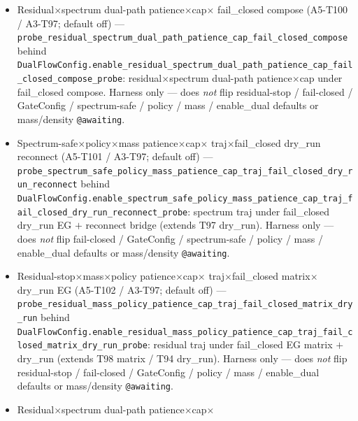\documentclass[11pt]{article}
\begin{document}
\begin{itemize}[leftmargin=1.5em]
  fail\_closed reconnect bridge (A5-T99 / A3-T94; default off) ---
  \texttt{probe\_residual\_mass\_policy\_patience\_cap\_fail\_closed\_bridge}
  behind
  \texttt{DualFlowConfig.enable\_residual\_mass\_policy\_patience\_cap\_fail\_closed\_bridge\_probe}:
  residual patience$\times$cap under fail\_closed reconnect
  (complements T92 matrix / T96 dry\_run). Harness only --- does
  \emph{not} flip residual-stop / fail-closed / GateConfig / policy /
  mass / enable\_dual defaults or mass/density \texttt{@awaiting}.
  \item Residual$\times$spectrum dual-path patience$\times$cap$\times$
  fail\_closed compose (A5-T100 / A3-T97; default off) ---
  \texttt{probe\_residual\_spectrum\_dual\_path\_patience\_cap\_fail\_closed\_compose}
  behind
  \texttt{DualFlowConfig.enable\_residual\_spectrum\_dual\_path\_patience\_cap\_fail\_closed\_compose\_probe}:
  residual$\times$spectrum dual-path patience$\times$cap under fail\_closed
  compose. Harness only --- does \emph{not} flip residual-stop /
  fail-closed / GateConfig / spectrum-safe / policy / mass /
  enable\_dual defaults or mass/density \texttt{@awaiting}.
  \item Spectrum-safe$\times$policy$\times$mass patience$\times$cap$\times$
  traj$\times$fail\_closed dry\_run reconnect (A5-T101 / A3-T97;
  default off) ---
  \texttt{probe\_spectrum\_safe\_policy\_mass\_patience\_cap\_traj\_fail\_closed\_dry\_run\_reconnect}
  behind
  \texttt{DualFlowConfig.enable\_spectrum\_safe\_policy\_mass\_patience\_cap\_traj\_fail\_closed\_dry\_run\_reconnect\_probe}:
  spectrum traj under fail\_closed dry\_run EG $+$ reconnect bridge
  (extends T97 dry\_run). Harness only --- does \emph{not} flip
  fail-closed / GateConfig / spectrum-safe / policy / mass /
  enable\_dual defaults or mass/density \texttt{@awaiting}.
  \item Residual-stop$\times$mass$\times$policy patience$\times$cap$\times$
  traj$\times$fail\_closed matrix$\times$dry\_run EG (A5-T102 / A3-T97;
  default off) ---
  \texttt{probe\_residual\_mass\_policy\_patience\_cap\_traj\_fail\_closed\_matrix\_dry\_run}
  behind
  \texttt{DualFlowConfig.enable\_residual\_mass\_policy\_patience\_cap\_traj\_fail\_closed\_matrix\_dry\_run\_probe}:
  residual traj under fail\_closed EG matrix $+$ dry\_run (extends T98
  matrix / T94 dry\_run). Harness only --- does \emph{not} flip
  residual-stop / fail-closed / GateConfig / policy / mass /
  enable\_dual defaults or mass/density \texttt{@awaiting}.
  \item Residual$\times$spectrum dual-path patience$\times$cap$\times$

\end{itemize}
\end{document}
